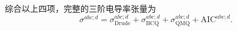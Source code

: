 综合以上四项，完整的三阶电导率张量为
\begin{equation}
  \sigma^{abc;d}
  = \sigma_{\text{Drude}}^{abc;d}
  + \sigma_{\text{BCQ}}^{abc;d}
  + \sigma_{\text{QMQ}}^{abc;d}
  + \mathrm{AIC}^{abc;d}.
  \label{sigma3_total}
\end{equation}




